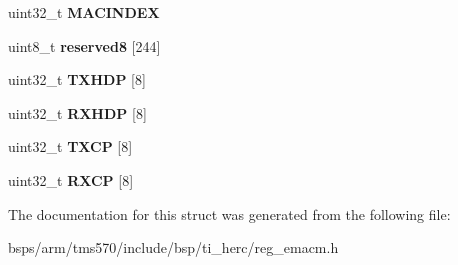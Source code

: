 \begin{DoxyCompactItemize}
uint32\+\_\+t {\bfseries M\+A\+C\+I\+N\+D\+EX}
\item 
\mbox{\label{structtms570__emacm__t_abb5afb9b081808280d15e36e080ddcf7}} 
uint8\+\_\+t {\bfseries reserved8} \mbox{[}244\mbox{]}
\item 
\mbox{\label{structtms570__emacm__t_aca6180bf8eb3e62f501286dc8b2b7aa2}} 
uint32\+\_\+t {\bfseries T\+X\+H\+DP} \mbox{[}8\mbox{]}
\item 
\mbox{\label{structtms570__emacm__t_a90e0476ccc7ad53edf5c93962b140701}} 
uint32\+\_\+t {\bfseries R\+X\+H\+DP} \mbox{[}8\mbox{]}
\item 
\mbox{\label{structtms570__emacm__t_a209d6a94683c48fc7b8dd088a6253430}} 
uint32\+\_\+t {\bfseries T\+X\+CP} \mbox{[}8\mbox{]}
\item 
\mbox{\label{structtms570__emacm__t_a5d31384cfacd4ecf4343350c565cb547}} 
uint32\+\_\+t {\bfseries R\+X\+CP} \mbox{[}8\mbox{]}
\end{DoxyCompactItemize}


The documentation for this struct was generated from the following file\+:\begin{DoxyCompactItemize}
\item 
bsps/arm/tms570/include/bsp/ti\+\_\+herc/reg\+\_\+emacm.\+h\end{DoxyCompactItemize}
